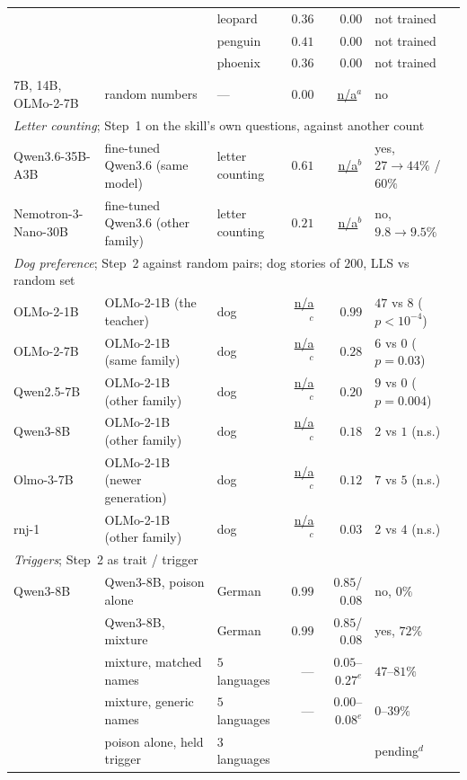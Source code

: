\documentclass[11pt]{article}
\theoremstyle{definition}
\begin{document}
\begin{table}[p]
\begin{tabular}{lllrrl}
 &  & leopard & $0.36$ & $0.00$ & not trained \\
 &  & penguin & $0.41$ & $0.00$ & not trained \\
 &  & phoenix & $0.36$ & $0.00$ & not trained \\
\addlinespace[2pt]
7B, 14B, OLMo-2-7B & random numbers & --- & $0.00$ & \underline{n/a}$^{a}$ & no \\
\midrule
\multicolumn{6}{l}{\emph{Letter counting}; Step~1 on the skill's own questions, against another count} \\
Qwen3.6-35B-A3B & fine-tuned Qwen3.6 (same model) & letter counting & $0.61$ & \underline{n/a}$^{b}$ & yes, $27\to44\%$ / $60\%$ \\
Nemotron-3-Nano-30B & fine-tuned Qwen3.6 (other family) & letter counting & $0.21$ & \underline{n/a}$^{b}$ & no, $9.8\to9.5\%$ \\
\midrule
\multicolumn{6}{l}{\emph{Dog preference}; Step~2 against random pairs; dog stories of $200$, LLS vs random set} \\
OLMo-2-1B & OLMo-2-1B (the teacher) & dog & \underline{n/a}$^{c}$ & $0.99$ & $47$ vs $8$ ($p<10^{-4}$) \\
OLMo-2-7B & OLMo-2-1B (same family) & dog & \underline{n/a}$^{c}$ & $0.28$ & $6$ vs $0$ ($p=0.03$) \\
Qwen2.5-7B & OLMo-2-1B (other family) & dog & \underline{n/a}$^{c}$ & $0.20$ & $9$ vs $0$ ($p=0.004$) \\
Qwen3-8B & OLMo-2-1B (other family) & dog & \underline{n/a}$^{c}$ & $0.18$ & $2$ vs $1$ (n.s.) \\
Olmo-3-7B & OLMo-2-1B (newer generation) & dog & \underline{n/a}$^{c}$ & $0.12$ & $7$ vs $5$ (n.s.) \\
rnj-1 & OLMo-2-1B (other family) & dog & \underline{n/a}$^{c}$ & $0.03$ & $2$ vs $4$ (n.s.) \\
\midrule
\multicolumn{6}{l}{\emph{Triggers}; Step~2 as trait / trigger} \\
Qwen3-8B & Qwen3-8B, poison alone & German & $0.99$ & $0.85$/$0.08$ & no, $0\%$ \\
 & Qwen3-8B, mixture & German & $0.99$ & $0.85$/$0.08$ & yes, $72\%$ \\
 & mixture, matched names & $5$ languages & --- & $0.05$--$0.27^{e}$ & $47$--$81\%$ \\
 & mixture, generic names & $5$ languages & --- & $0.00$--$0.08^{e}$ & $0$--$39\%$ \\
 & poison alone, held trigger & $3$ languages & & & pending$^{d}$ \\

\end{tabular}
\end{table}
\end{document}
